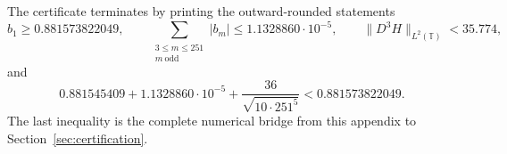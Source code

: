 The certificate terminates by printing the outward-rounded statements
\[
  b_1\ge0.881573822049,
  \qquad
  \sum_{\substack{3\le m\le251\\m\ \mathrm{odd}}}|b_m|
  \le1.1328860\cdot10^{-5},
  \qquad
  \|D^3H\|_{L^2(\mathbb T)}<35.774,
\]
and
\[
  0.881545409+1.1328860\cdot10^{-5}
  +\frac{36}{\sqrt{10\cdot251^5}}
  <0.881573822049.
\]
The last inequality is the complete numerical bridge from this appendix to
Section~\ref{sec:certification}.
